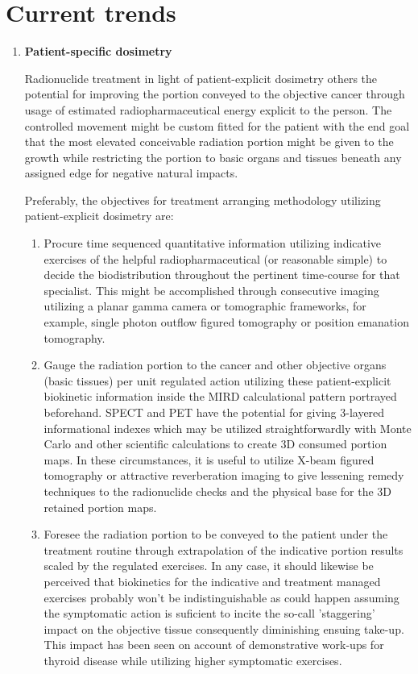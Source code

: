 \documentclass[12pt]{article}
\begin{document}
\section{Current trends}
\begin{enumerate}
\item \textbf{Patient-specific dosimetry} \par Radionuclide treatment in light of patient-explicit dosimetry others the potential for improving the portion conveyed to the objective cancer through usage of estimated radiopharmaceutical energy explicit to the person. The controlled movement might be custom fitted for the patient with the end goal that the most elevated conceivable radiation portion might be given to the growth while restricting the portion to basic organs and tissues beneath any assigned edge for negative natural impacts. \par Preferably, the objectives for treatment arranging methodology utilizing patient-explicit dosimetry are: \par
	\begin{enumerate}
		\item Procure time sequenced quantitative information utilizing indicative exercises of the helpful radiopharmaceutical (or reasonable simple) to decide 			the biodistribution throughout the pertinent time-course for that specialist. This might be accomplished through consecutive imaging utilizing a 					planar gamma camera or tomographic frameworks, for example, single photon outflow figured tomography or position emanation tomography. 
		\item	Gauge the radiation portion to the cancer and other objective organs (basic tissues) per unit regulated action utilizing these patient-explicit 						biokinetic information inside the MIRD calculational pattern portrayed beforehand. SPECT and PET have the potential for giving 3-layered 						informational indexes which may be utilized straightforwardly with Monte Carlo and other scientific calculations to create 3D consumed portion 					maps. In these circumstances, it is useful to utilize X-beam figured tomography or attractive reverberation imaging to give lessening remedy 					techniques to the radionuclide checks and the physical base for the 3D retained portion maps.	
		\item Foresee the radiation portion to be conveyed to the patient under the treatment routine through extrapolation of the indicative portion results 					scaled by the regulated exercises. In any case, it should likewise be perceived that biokinetics for the indicative and treatment managed exercises 			probably won't be indistinguishable as could happen assuming the symptomatic action is suficient to incite the so-call 'staggering' impact on the 					objective tissue consequently diminishing ensuing take-up. This impact has been seen on account of demonstrative work-ups for thyroid disease 					while utilizing higher symptomatic exercises.			

\end{enumerate}
\end{enumerate}
\end{document}
